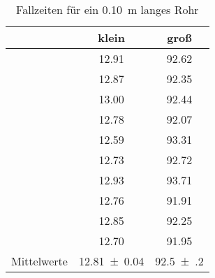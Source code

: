 \begin{table}[h!]
\centering
\begin{tabular}{c|c|c}
	& klein & groß \\
	\hline
	& 12.91 & 92.62 \\
	& 12.87 & 92.35 \\
	& 13.00 & 92.44 \\
	& 12.78 & 92.07 \\
	& 12.59 & 93.31 \\
	& 12.73 & 92.72 \\
	& 12.93 & 93.71 \\
	& 12.76 & 91.91 \\
	& 12.85 & 92.25 \\
	& 12.70 & 91.95 \\
	\hline
	Mittelwerte & \SI{12.81(4)}{} & \SI{92.5(2)}{}
\end{tabular}
\caption{Fallzeiten für ein \SI{0.10}{\metre} langes Rohr}
\label{fig:DatenZeit}
\end{table}